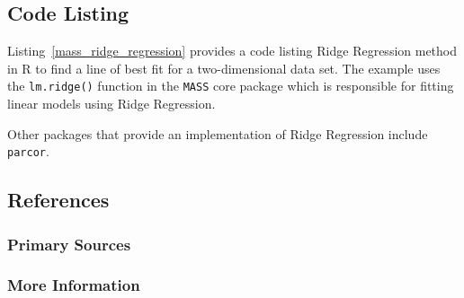 \subsection{Code Listing}
Listing~\ref{mass_ridge_regression} provides a code listing Ridge Regression method in R to find a line of best fit for a two-dimensional data set.
The example uses the \texttt{lm.ridge()} function in the \texttt{MASS} core package which is responsible for fitting linear models using Ridge Regression.





Other packages that provide an implementation of Ridge Regression include \texttt{parcor}.


\subsection{References}

\subsubsection{Primary Sources}


\subsubsection{More Information}



